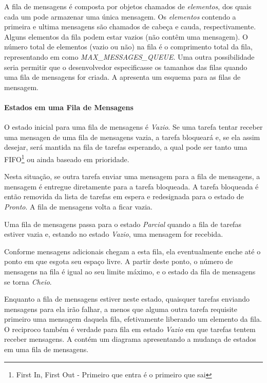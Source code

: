 A fila de mensagens é composta por objetos chamados de \emph{elementos}, dos quais cada um pode armazenar uma única mensagem. Os \emph{elementos} contendo a primeira e ultima mensagens são chamados de cabeça e cauda, respectivamente. Alguns elementos da fila podem estar vazios (não contêm uma mensagem). O número total de elementos (vazio ou não) na fila é o comprimento total da fila, representando em  como \emph{MAX\_MESSAGES\_QUEUE}. Uma outra possibilidade seria permitir que o desenvolvedor especificasse os tamanhos das filas quando uma fila de mensagens for criada. A  apresenta um esquema para as filas de mensagem.


\paragraph{Estados em uma Fila de Mensagens}

O estado inicial para uma fila de mensagens é \emph{Vazio}. Se uma tarefa tentar receber uma mensagen de uma fila de mensagens vazia, a tarefa bloqueará e, se ela assim desejar, será mantida na fila de tarefas esperando, a qual pode ser tanto uma FIFO\footnote{First In, First Out - Primeiro que entra é o primeiro que sai} ou ainda baseado em prioridade.

Nesta situação, se outra tarefa enviar uma mensagem para a fila de mensagens, a mensagem é entregue diretamente para a tarefa bloqueada. A tarefa bloqueada é então removida da lista de tarefas em espera e redesignada para o estado de \emph{Pronto}. A fila de mensagens volta a ficar vazia.

Uma fila de mensagens passa para o estado \emph{Parcial} quando a fila de tarefas estiver vazia e, estando no estado \emph{Vazio}, uma mensagem for recebida.

Conforme mensagens adicionais chegam a esta fila, ela eventualmente enche até o ponto em que esgota seu espaço livre. A partir deste ponto, o número de mensagens na fila é igual ao seu limite máximo, e o estado da fila de mensagens se torna \emph{Cheio}. 

Enquanto a fila de mensagens estiver neste estado, quaisquer tarefas enviando mensagens para ela irão falhar, a menos que alguma outra tarefa requisite primeiro uma mensagem daquela fila, efetivamente liberando um elemento da fila. O reciproco também é verdade para fila em estado \emph{Vazio} em que tarefas tentem receber mensagens. A  contém um diagrama apresentando a mudança de estados em uma fila de mensagens.

